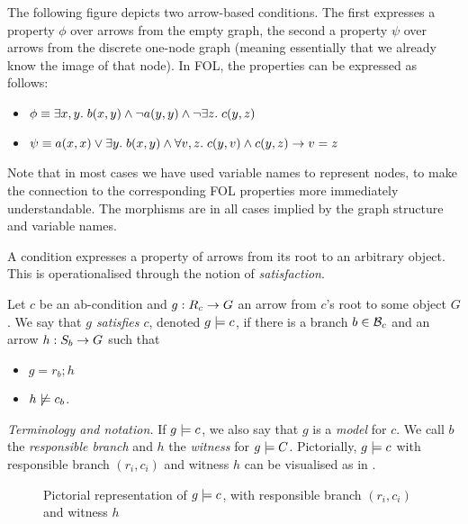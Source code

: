 \begin{example}
The following figure depicts two arrow-based conditions. The first expresses a property $\phi$ over arrows from the empty graph, the second a property $\psi$ over arrows from the discrete one-node graph (meaning essentially that we already know the image of that node). In FOL, the properties can be expressed as follows:
\begin{itemize}
\item $\phi\equiv \exists x,y.\; b(x,y) \wedge \neg a(y,y)\wedge \neg \exists z.\; c(y,z)$
\item $\psi\equiv a(x,x)\vee \exists y.\; b(x,y) \wedge \forall v,z.\; c(y,v)\wedge c(y,z) \rightarrow v=z$
\end{itemize}
Note that in most cases we have used variable names to represent nodes, to make the connection to the corresponding FOL properties more immediately understandable. The morphisms are in all cases implied by the graph structure and variable names.
\begin{center}

\end{center}
\end{example}
%
A condition expresses a property of arrows from its root to an arbitrary object. This is operationalised through the notion of \emph{satisfaction}.

\begin{definition}
  Let $c$ be an ab-condition and $g:R_c\rightarrow G$ an arrow from $c$'s root to some object $G$. We say that \emph{$g$ satisfies $c$}, denoted $g\models c$, if there is a branch $b\in \mathcal{B}_c$ and an arrow $h:S_b\rightarrow G$ such that
  \begin{itemize}
  \item $g=r_b;h$
  \item $h\not\models c_b$.
  \end{itemize}
\end{definition}
%
\emph{Terminology and notation.} If $g\models c$, we also say that $g$ is a \emph{model} for $c$. We call $b$ the \emph{responsible branch} and $h$ the \emph{witness} for $g\models C$. Pictorially, $g\models c$ with responsible branch $(r_i,c_i)$ and witness $h$ can be visualised as in .
%
\begin{figure}
  \centering
  
  \caption{Pictorial representation of $g\models c$, with responsible branch $(r_i,c_i)$ and witness $h$}
\end{figure}

